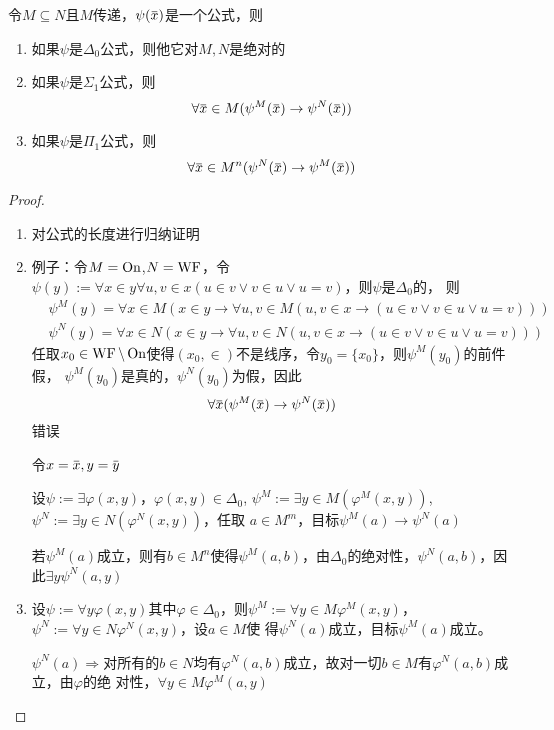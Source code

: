 \documentclass[11pt]{article}
\begin{document}
\begin{lemma}[]
令\(M\subseteq N\)且\(M\)传递，\(\psi(\barx)\)是一个公式，则
\begin{enumerate}
\item 如果\(\psi\)是\(\Delta_0\)公式，则他它对\(M,N\)是绝对的
\item 如果\(\psi\)是\(\Sigma_1\)公式，则
\begin{equation*}
\forall\barx\in M(\psi^M(\barx)\to\psi^N(\barx))
\end{equation*}
\item 如果\(\psi\)是\(\Pi_1\)公式，则
\begin{equation*}
\forall\barx\in M^n(\psi^N(\barx)\to\psi^M(\barx))
\end{equation*}
\end{enumerate}
\end{lemma}

\begin{proof}
\begin{enumerate}
\item 对公式的长度进行归纳证明
\item 例子：令\(M=\operatorname{On}\),\(N=\operatorname{WF}\)，令\(\psi(y):=\forall x\in y\forall u,v\in x(u\in v\vee v\in u\vee u=v)\)，则\(\psi\)是\(\Delta_0\)的，
则
\begin{align*}
&\psi^M(y)=\forall x\in M(x\in y\to\forall u,v\in M(u,v\in x\to(u\in v\vee v\in u\vee u=v)))\\
&\psi^N(y)=\forall x\in N(x\in y\to\forall u,v\in N(u,v\in x\to(u\in v\vee v\in u\vee u=v)))
\end{align*}
任取\(x_0\in\operatorname{WF}\setminus\operatorname{On}\)使得\((x_0,\in)\)不是线序，令\(y_0=\{x_0\}\)，则\(\psi^M(y_0)\)的前件假，
\(\psi^M(y_0)\)是真的，\(\psi^N(y_0)\)为假，因此
\begin{equation*}
\forall\barx(\psi^M(\barx)\to\psi^N(\barx))
\end{equation*}
错误

令\(x=\barx,y=\bary\)

设\(\psi:=\exists\varphi(x,y)\)，\(\varphi(x,y)\in\Delta_0\), \(\psi^M:=\exists y\in M(\varphi^M(x,y))\), \(\psi^N:=\exists y\in N(\varphi^N(x,y))\)，任取
\(a\in M^m\)，目标\(\psi^M(a)\to\psi^N(a)\)

若\(\psi^M(a)\)成立，则有\(b\in M^n\)使得\(\psi^M(a,b)\)，由\(\Delta_0\)的绝对性，\(\psi^N(a,b)\)，因此\(\exists y\psi^N(a,y)\)
\item 设\(\psi:=\forall y\varphi(x,y)\)其中\(\varphi\in\Delta_0\)，则\(\psi^M:=\forall y\in M\varphi^M(x,y)\)，\(\psi^N:=\forall y\in N\varphi^N(x,y)\)，设\(a\in M\)使
得\(\psi^N(a)\)成立，目标\(\psi^M(a)\)成立。

\(\psi^N(a)\Rightarrow\)对所有的\(b\in N\)均有\(\varphi^N(a,b)\)成立，故对一切\(b\in M\)有\(\varphi^N(a,b)\)成立，由\(\varphi\)的绝
对性，\(\forall y\in M\varphi^M(a,y)\)
\end{enumerate}
\end{proof}
\end{document}
